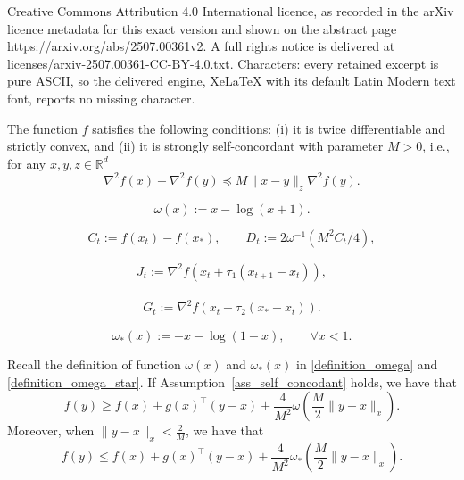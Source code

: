 \documentclass[10pt,a4paper]{amsart}
\begin{document}
Creative Commons Attribution 4.0 International licence, as recorded in the arXiv licence metadata for this exact version and shown on the abstract page https://arxiv.org/abs/2507.00361v2. A full rights notice is delivered at licenses/arxiv-2507.00361-CC-BY-4.0.txt. Characters: every retained excerpt is pure ASCII, so the delivered engine, XeLaTeX with its default Latin Modern text font, reports no missing character.
\begin{assumption}\label{ass_self_concodant}
The function $f$ satisfies the following conditions: (i) it is twice differentiable and strictly convex, and (ii) it is strongly self-concordant with parameter $M > 0$, i.e., for any $x, y, z \in \mathbb{R}^d$
\begin{equation}
\nabla^2{f(x)} - \nabla^2{f(y)} \preceq M\|x - y\|_{z}\nabla^2{f(y)}.
\end{equation}
\end{assumption}

\begin{equation}\label{definition_omega}
    \omega(x) := x - \log{(x + 1)}.
\end{equation}

\begin{equation}\label{suboptimality}
    C_t := f(x_t) - f(x_*),\qquad 
    D_t := 2\omega^{-1}\left({M^2}C_t/4\right),
\end{equation} 

\begin{align}\label{def_J}
    J_t := \nabla^2{f(x_t + \tau_1 (x_{t + 1} - x_t))},
\end{align}

\begin{align}\label{def_G}
    G_t := \nabla^2{f(x_t + \tau_2 (x_{*} - x_t))}.
\end{align}

\begin{equation}\label{definition_omega_star}
    \omega_{*}(x) := - x - \log{(1 - x)}, \qquad \forall x < 1.
\end{equation}

\begin{lemma}\label{lemma_concordance}
    Recall the definition of function $\omega(x)$ and $\omega_*(x)$ in \eqref{definition_omega} and \eqref{definition_omega_star}. If Assumption~\ref{ass_self_concodant} holds, we have that
    \begin{equation}
        f(y) \geq f(x) + g(x)^\top(y - x) + \frac{4}{M^2}\omega(\frac{M}{2}\|y - x\|_x).
    \end{equation}
    Moreover, when $\|y - x\|_x < \frac{2}{M}$, we have that
    \begin{equation}
        f(y) \leq f(x) + g(x)^\top(y - x) + \frac{4}{M^2}\omega_{*}(\frac{M}{2}\|y - x\|_x).
    \end{equation}
\end{lemma}
\end{document}
